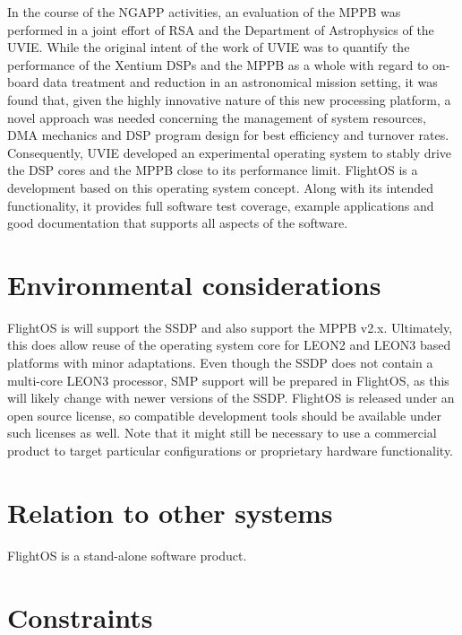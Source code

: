 In the course of the \gls{NGAPP} activities, an evaluation of the \gls{MPPB}
was performed in a joint effort of \gls{RSA} and the Department of Astrophysics
of the \gls{UVIE}. While the original intent of the work of \gls{UVIE} was to
quantify the performance of the \gls{Xentium} \glspl{DSP} and the \gls{MPPB} as a
whole with regard to on-board data treatment and reduction in an astronomical
mission setting, it was found that, given the highly innovative nature of this new
processing platform, a novel approach was needed concerning the management of
system resources, \gls{DMA} mechanics and \gls{DSP} program design for best
efficiency and turnover rates. Consequently, \gls{UVIE} developed an experimental
operating system to stably drive the \gls{DSP} cores and the \gls{MPPB} close
to its performance limit. FlightOS is a development based on this operating system
concept. Along with its intended functionality, it provides full software test
coverage, example applications and good documentation that supports all aspects
of the software.


\section{Environmental considerations}

FlightOS is will support the \gls{SSDP} and also support the
\gls{MPPB} v2.x. Ultimately, this does allow reuse of the operating system core
for \gls{LEON2} and \gls{LEON3} based platforms with minor adaptations.
Even though the \gls{SSDP} does not contain a multi-core \gls{LEON3} processor,
\gls{SMP} support will be prepared in FlightOS, as this will likely change with
newer versions of the \gls{SSDP}.
FlightOS is released under an open source license, so compatible development tools should
be available under such licenses as well. Note that it might still be necessary
to use a commercial product to target particular configurations or proprietary
hardware functionality.


\section{Relation to other systems}

FlightOS is a stand-alone software product.


\section{Constraints}


